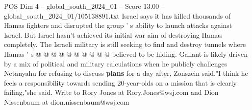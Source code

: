 \begin{textsample}{POS Dim 4 – global\_south\_2024\_01 – Score 13.00 – global\_south\_2024\_01/105138891.txt}
Israel says it has killed thousands of Hamas fighters and disrupted the group ' s ability to launch attacks against Israel.
But Israel hasn't achieved its initial war aim of destroying Hamas completely.
The Israeli military is still seeking to find and destroy tunnels where Hamas ' s @ @ @ @ @ @ @ @ @ @ believed to be hiding.
Gallant is likely driven by a mix of political and military calculations when he publicly challenges Netanyahu for refusing to discuss \textbf{plans} for a day after, Zonszein said."I think he feels a responsibility towards sending 20-year-olds on a mission that is clearly failing,"she said.
Write to Rory Jones at Rory.Jones@wsj.com and Dion Nissenbaum at dion.nissenbaum@wsj.com

\end{textsample}
